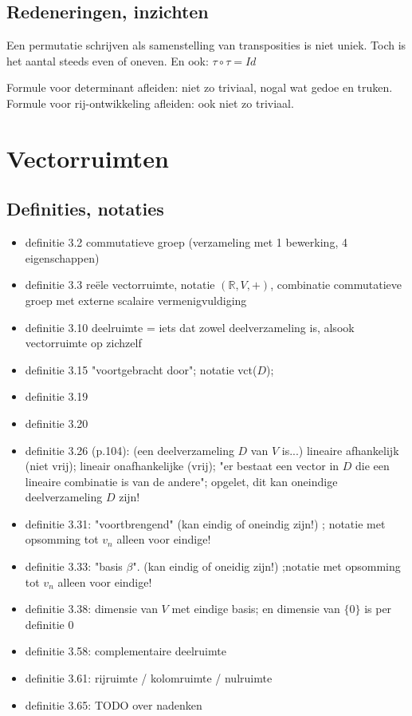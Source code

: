 \documentclass{article}
\begin{document}
\subsection{Redeneringen, inzichten}

Een permutatie schrijven als samenstelling van transposities is niet uniek. Toch is het aantal steeds even of oneven. En ook: $\tau \circ \tau = Id$

Formule voor determinant afleiden: niet zo triviaal, nogal wat gedoe en truken. 
Formule voor rij-ontwikkeling afleiden: ook niet zo triviaal. 
 

\section{Vectorruimten}

\subsection{Definities, notaties}

\begin{itemize}
    \item definitie 3.2 commutatieve groep (verzameling met 1 bewerking, 4 eigenschappen)
    \item definitie 3.3 re\"ele vectorruimte, notatie $(\mathbb{R},V,+)$, combinatie commutatieve groep met externe scalaire vermenigvuldiging
    \item definitie 3.10 deelruimte = iets dat zowel deelverzameling is, alsook vectorruimte op zichzelf
    \item definitie 3.15 "voortgebracht door"; notatie vct($D$); 
    \item definitie 3.19 
    \item definitie 3.20 
    \item definitie 3.26 (p.104): (een deelverzameling $D$ van $V$ is...) lineaire afhankelijk (niet vrij); lineair onafhankelijke (vrij); "er bestaat een vector in $D$ die een lineaire combinatie is van de andere"; opgelet, dit kan oneindige deelverzameling $D$ zijn! 
    \item definitie 3.31: "voortbrengend" (kan eindig of oneindig zijn!) ; notatie met opsomming tot $v_n$ alleen voor eindige! 
    \item definitie 3.33: "basis $\beta$". (kan eindig of oneidig zijn!) ;notatie met opsomming tot $v_n$ alleen voor eindige! 
    \item definitie 3.38: dimensie van $V$ met eindige basis; en dimensie van $\{ 0\}$ is per definitie $0$
    \item definitie 3.58: complementaire deelruimte
    \item definitie 3.61: rijruimte / kolomruimte / nulruimte 
    \item definitie 3.65: TODO over nadenken 
\end{itemize}
\end{document}
